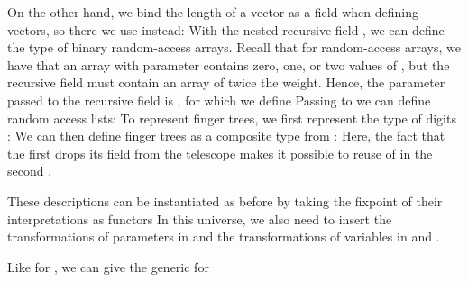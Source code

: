 On the other hand, we bind the length of a vector as a field when defining vectors, so there we use  instead:
With the nested recursive field , we can define the type of binary random-access arrays. Recall that for random-access arrays, we have that an array with parameter  contains zero, one, or two values of , but the recursive field must contain an array of twice the weight. Hence, the parameter passed to the recursive field is , for which we define
Passing  to  we can define random access lists:  
To represent finger trees, we first represent the type of digits :
We can then define finger trees as a composite type from :
Here, the fact that the first  drops its field from the telescope makes it possible to reuse of  in the second .

These descriptions can be instantiated as before by taking the fixpoint
of their interpretations as functors
In this universe, we also need to insert the transformations of parameters  in  and the transformations of variables  in  and .

Like for , we can give the generic  for 

